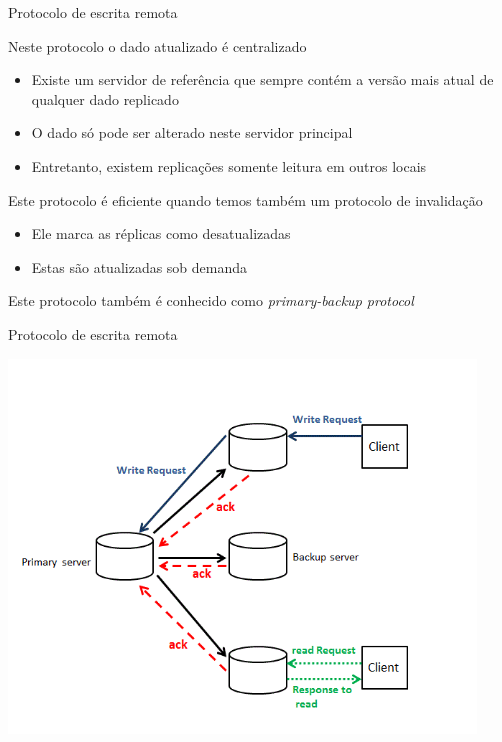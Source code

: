 \documentclass[compress]{beamer}
\begin{document}
\begin{frame}{Protocolo de escrita remota}

Neste protocolo o dado atualizado é centralizado
\begin{itemize}
    \item Existe um servidor de referência que sempre contém a versão mais atual de qualquer dado replicado
    \item O dado só pode ser alterado neste servidor principal
    \item Entretanto, existem replicações somente leitura em outros locais
\end{itemize}

\vspace{0.5cm}

Este protocolo é eficiente quando temos também um protocolo de invalidação
\begin{itemize}
    \item Ele marca as réplicas como desatualizadas
    \item Estas são atualizadas sob demanda
\end{itemize}

\vspace{0.5cm}

Este protocolo também é conhecido como \textit{primary-backup protocol}
\end{frame}


\begin{frame}{Protocolo de escrita remota}

\centering \includegraphics[width=0.93\textwidth]{images/remote-write.png}
\end{frame}
\end{document}
